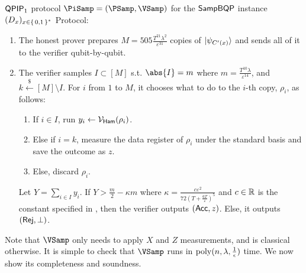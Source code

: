 \begin{protocol}{$\operatorname{\mathsf{QPIP}}_1$ protocol $\PiSamp=(\PSamp, \VSamp)$ for the $\operatorname{\mathsf{SampBQP}}$ instance $(D_x)_{x\in\set{0, 1}^*}$}
	Protocol:
	\begin{enumerate}
		\item\label{step:qpip1-state-gen} The honest prover prepares $M=505\frac{T^{21}\lambda^2}{\varepsilon^{31}}$ copies of $\ket{\psi_{C'(x)}}$ and sends all of it to the verifier qubit-by-qubit.
		\item\label{step:qpip1-verify} The verifier samples $I\subset[M]$ s.t. $\abs{I}=m$ where $m=\frac{T^{10}\lambda}{\varepsilon^{14}}$, and $k\xleftarrow{\$}[M]\setminus I$.
			For $i$ from $1$ to $M$, it chooses what to do to the $i$-th copy, $\rho_i$, as follows:
		\begin{enumerate}
			\item If $i\in I$, run $y_i\leftarrow\mathcal{V}_{\mathsf{Ham}}(\rho_i)$.
			\item Else if $i=k$, measure the data register  of $\rho_i$ under the standard basis and save the outcome as $z$.
			\item Else, discard $\rho_i$.
		\end{enumerate}
			Let $Y=\sum_{i\in I} y_i$. If $Y>\frac{m}{2}-\kappa m$ where $\kappa=\frac{c\varepsilon^2}{72\left(T+\frac{6T}{\varepsilon}\right)^5}$ and $c\in\mathbb{R}$ is the constant specified in , then the verifier outputs $(\mathsf{Acc}, z)$.
			Else, it outputs $(\mathsf{Rej}, \bot)$.
	\end{enumerate}
\end{protocol}

Note that $\VSamp$ only needs to apply $X$ and $Z$ measurements, and is classical otherwise.
It is simple to check that $\VSamp$ runs in $\operatorname*{\operatorname{poly}}(n, \lambda, \frac{1}{\epsilon})$ time.
We now show its completeness and soundness.
  
